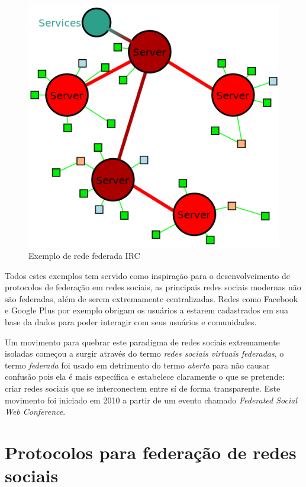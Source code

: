 \documentclass[12pt]{article}
\begin{document}
\begin{figure}[h]
\center
\includegraphics[scale=0.4]{Ircnetz-Schema.png}
\caption{Exemplo de rede federada IRC}
\label{irc}
\end{figure}

Todos estes exemplos tem servido como inspiração para o desenvolveimento de
protocolos de federação em redes sociais, as principais redes sociais modernas
não são federadas, além de serem extremamente centralizadas. Redes como
Facebook e Google Plus por exemplo obrigam os usuários a estarem cadastrados
em sua base da dados para poder interagir com seus usuários e comunidades.

Um movimento para quebrar este paradigma de redes sociais extremamente
isoladas começou a surgir através do termo {\it redes sociais virtuais
federadas}, o termo {\it federada} foi usado em detrimento do termo {\it
aberta} para não causar confusão pois ela é mais específica e estabelece
claramente o que se pretende: criar redes sociais que se interconectem entre
sí de forma transparente. Este movimento foi iniciado em 2010 a partir de um
evento chamado {\it Federated Social Web Conference}\cite{aurelio}.

\section{Protocolos para federação de redes sociais}
\end{document}
